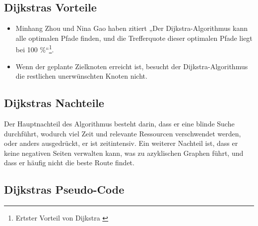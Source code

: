 \subsection{Dijkstras Vorteile}

\begin{itemize}
	\item Minhang Zhou und Nina Gao haben zitiert „Der Dijkstra-Algorithmus kann alle optimalen Pfade finden, und die Trefferquote dieser optimalen Pfade liegt bei 100 \%“\footnote{Ertster Vorteil von Dijkstra \cite{Zhou2013}}.
	\item Wenn der geplante Zielknoten erreicht ist, besucht der Dijkstra-Algorithmus die restlichen unerwünschten Knoten nicht\cite{Abusalim2020}. 
\end{itemize}


\subsection{Dijkstras Nachteile}

Der Hauptnachteil des Algorithmus besteht darin, dass er eine blinde Suche durchführt, wodurch viel Zeit und relevante Ressourcen verschwendet werden, oder anders ausgedrückt, er ist zeitintensiv. Ein weiterer Nachteil ist, dass er keine negativen Seiten verwalten kann, was zu azyklischen Graphen führt, und dass er häufig nicht die beste Route findet\cite{Mukhlif2020}.

\subsection{Dijkstras Pseudo-Code}

